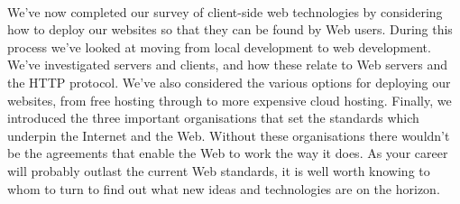 \paragraph{} We've now completed our survey of client-side web technologies by considering how to deploy our websites so that they can be found by Web users. During this process we've looked at moving from local development to web development. We’ve investigated servers and clients, and how these relate to Web servers and the HTTP protocol. We’ve also considered the various options for deploying our websites, from free hosting through to more expensive cloud hosting. Finally, we introduced the three important organisations that set the standards which underpin the Internet and the Web. Without these organisations there wouldn't be the agreements that enable the Web to work the way it does. As your career will probably outlast the current Web standards, it is well worth knowing to whom to turn to find out what new ideas and technologies are on the horizon.
